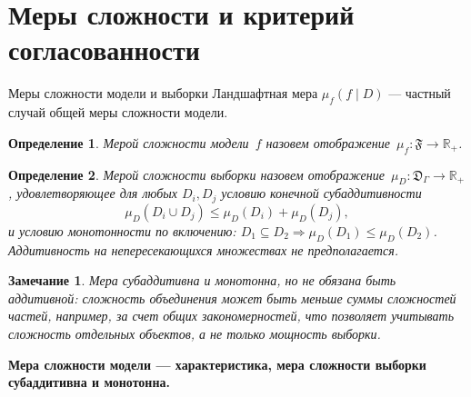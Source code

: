 \documentclass[9pt,pdf,hyperref={unicode}]{beamer}
\newtheorem{rusdefinition}{Определение}
\newtheorem{rusremark}{Замечание}
\newcommand{\key}[1]{\par\vspace{0.5ex}\noindent\textbf{\color{darkgreen}#1}}
\begin{document}
\section{Меры сложности и критерий согласованности}
\begin{frame}{Меры сложности модели и выборки}
\justifying
\small
Ландшафтная мера $\mu_f(f\mid D)$ --- частный случай общей меры сложности модели.
\begin{rusdefinition}
    Мерой сложности модели~$f$ назовем отображение~$\mu_f:\mathfrak{F}\to\mathbb{R}_+$.
\end{rusdefinition}

\begin{rusdefinition}
    Мерой сложности выборки назовем отображение~$\mu_D:\mathfrak{D}_\Gamma\to\mathbb{R}_+$, удовлетворяющее для любых $D_i,D_j$ условию конечной субаддитивности
    \[
        \mu_D(D_i\cup D_j)\le\mu_D(D_i)+\mu_D(D_j),
    \]
    и условию монотонности по включению: $D_1\subseteq D_2\Rightarrow\mu_D(D_1)\le\mu_D(D_2)$. Аддитивность на непересекающихся множествах не предполагается.
\end{rusdefinition}

\begin{rusremark}
    Мера субаддитивна и монотонна, но не обязана быть аддитивной: сложность объединения может быть меньше суммы сложностей частей, например, за счет общих закономерностей, что позволяет учитывать сложность отдельных объектов, а не только мощность выборки.
\end{rusremark}
\key{Мера сложности модели --- характеристика, мера сложности выборки субаддитивна и монотонна.}
\end{frame}
\end{document}
